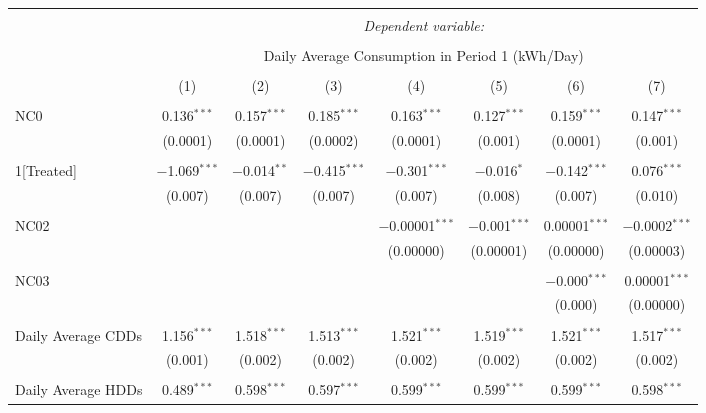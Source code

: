 
\begin{table}[!htbp] \centering 
  \caption{} 
  \label{} 
\small 
\begin{tabular}{@{\extracolsep{5pt}}lccccccc} 
\\[-1.8ex]\hline 
\hline \\[-1.8ex] 
 & \multicolumn{7}{c}{\textit{Dependent variable:}} \\ 
\cline{2-8} 
\\[-1.8ex] & \multicolumn{7}{c}{Daily Average Consumption in Period 1 (kWh/Day)} \\ 
\\[-1.8ex] & (1) & (2) & (3) & (4) & (5) & (6) & (7)\\ 
\hline \\[-1.8ex] 
 NC0 & 0.136$^{***}$ & 0.157$^{***}$ & 0.185$^{***}$ & 0.163$^{***}$ & 0.127$^{***}$ & 0.159$^{***}$ & 0.147$^{***}$ \\ 
  & (0.0001) & (0.0001) & (0.0002) & (0.0001) & (0.001) & (0.0001) & (0.001) \\ 
  & & & & & & & \\ 
 1[Treated] & $-$1.069$^{***}$ & $-$0.014$^{**}$ & $-$0.415$^{***}$ & $-$0.301$^{***}$ & $-$0.016$^{*}$ & $-$0.142$^{***}$ & 0.076$^{***}$ \\ 
  & (0.007) & (0.007) & (0.007) & (0.007) & (0.008) & (0.007) & (0.010) \\ 
  & & & & & & & \\ 
 NC02 &  &  &  & $-$0.00001$^{***}$ & $-$0.001$^{***}$ & 0.00001$^{***}$ & $-$0.0002$^{***}$ \\ 
  &  &  &  & (0.00000) & (0.00001) & (0.00000) & (0.00003) \\ 
  & & & & & & & \\ 
 NC03 &  &  &  &  &  & $-$0.000$^{***}$ & 0.00001$^{***}$ \\ 
  &  &  &  &  &  & (0.000) & (0.00000) \\ 
  & & & & & & & \\ 
 Daily Average CDDs & 1.156$^{***}$ & 1.518$^{***}$ & 1.513$^{***}$ & 1.521$^{***}$ & 1.519$^{***}$ & 1.521$^{***}$ & 1.517$^{***}$ \\ 
  & (0.001) & (0.002) & (0.002) & (0.002) & (0.002) & (0.002) & (0.002) \\ 
  & & & & & & & \\ 
 Daily Average HDDs & 0.489$^{***}$ & 0.598$^{***}$ & 0.597$^{***}$ & 0.599$^{***}$ & 0.599$^{***}$ & 0.599$^{***}$ & 0.598$^{***}$ \\ 

\end{tabular}
\end{table}
